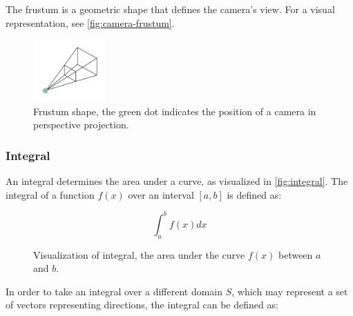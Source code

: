 The frustum is a geometric shape that defines the camera's view. For a visual representation, see \autoref{fig:camera-frustum}.

\begin{figure}[H]
  \centering
  \includegraphics[width=0.25\textwidth]{resources/camera-frustum.png}
  \caption{Frustum shape, the green dot indicates the position of a camera in perspective projection.}
  \label{fig:camera-frustum}
\end{figure}

\subsubsection{Integral}

An integral determines the area under a curve, as visualized in \autoref{fig:integral}. The integral of a function $f(x)$ over an interval $[a, b]$ is defined as:

\begin{equation}
  \label{eqn:integral}
  \int_{a}^{b} f(x) dx
\end{equation}

\begin{figure}[H]
  \centering
  \caption{Visualization of integral, the area under the curve $f(x)$ between $a$ and $b$.}
  \label{fig:integral}
\end{figure}

In order to take an integral over a different domain $S$, which may represent a set of vectors representing directions, the integral can be defined as:

